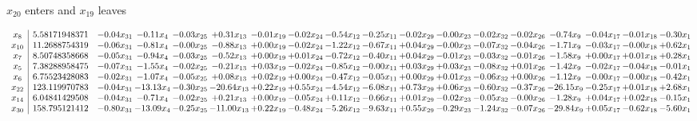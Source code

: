\documentclass[9pt]{article}
\begin{document}
 $ x_{20} $ enters and $ x_{19} $ leaves 

 \[\begin{array}{c| c c@{\hskip 2pt} c@{\hskip 2pt} c@{\hskip 2pt} c@{\hskip 2pt} c@{\hskip 2pt} c@{\hskip 2pt} c@{\hskip 2pt} c@{\hskip 2pt} c@{\hskip 2pt} c@{\hskip 2pt} c@{\hskip 2pt} c@{\hskip 2pt} c@{\hskip 2pt} c@{\hskip 2pt} c@{\hskip 2pt} c@{\hskip 2pt} }
 x_{8}   &  5.58171948371 & -0.04 x_{31} & -0.11 x_{4} & -0.03 x_{25} & +  0.31 x_{13} & -0.01 x_{19} & -0.02 x_{24} & -0.54 x_{12} & -0.25 x_{11} & -0.02 x_{29} & -0.00 x_{23} & -0.02 x_{32} & -0.02 x_{26} & -0.74 x_{9} & -0.04 x_{17} & -0.01 x_{18} & -0.30 x_{1}\\
 x_{10}   &  11.2688754319 & -0.06 x_{31} & -0.81 x_{4} & -0.00 x_{25} & -0.88 x_{13} & +  0.00 x_{19} & -0.02 x_{24} & -1.22 x_{12} & -0.67 x_{11} & +  0.04 x_{29} & -0.00 x_{23} & -0.07 x_{32} & -0.04 x_{26} & -1.71 x_{9} & -0.03 x_{17} & -0.00 x_{18} & +  0.62 x_{1}\\
 x_{7}   &  8.50748358668 & -0.05 x_{31} & -0.94 x_{4} & -0.03 x_{25} & -0.52 x_{13} & +  0.00 x_{19} & +  0.01 x_{24} & -0.72 x_{12} & -0.40 x_{11} & +  0.04 x_{29} & -0.01 x_{23} & -0.03 x_{32} & -0.01 x_{26} & -1.58 x_{9} & +  0.00 x_{17} & +  0.01 x_{18} & +  0.28 x_{1}\\
 x_{5}   &  7.38288958475 & -0.07 x_{31} & -1.55 x_{4} & -0.02 x_{25} & -0.21 x_{13} & +  0.03 x_{19} & -0.02 x_{24} & -0.85 x_{12} & -0.00 x_{11} & +  0.03 x_{29} & +  0.03 x_{23} & -0.08 x_{32} & +  0.01 x_{26} & -1.42 x_{9} & -0.02 x_{17} & -0.04 x_{18} & -0.01 x_{1}\\
 x_{6}   &  6.75523428083 & -0.02 x_{31} & -1.07 x_{4} & -0.05 x_{25} & +  0.08 x_{13} & +  0.02 x_{19} & +  0.00 x_{24} & -0.47 x_{12} & -0.05 x_{11} & +  0.00 x_{29} & +  0.01 x_{23} & -0.06 x_{32} & +  0.00 x_{26} & -1.12 x_{9} & -0.00 x_{17} & -0.00 x_{18} & -0.42 x_{1}\\
 x_{22}   &  123.119970783 & -0.04 x_{31} & -13.13 x_{4} & -0.30 x_{25} & -20.64 x_{13} & +  0.22 x_{19} & +  0.55 x_{24} & -4.54 x_{12} & -6.08 x_{11} & +  0.73 x_{29} & +  0.06 x_{23} & -0.60 x_{32} & -0.37 x_{26} & -26.15 x_{9} & -0.25 x_{17} & +  0.01 x_{18} & +  2.68 x_{1}\\
 x_{14}   &  6.04841429508 & -0.04 x_{31} & -0.71 x_{4} & -0.02 x_{25} & +  0.21 x_{13} & +  0.00 x_{19} & -0.05 x_{24} & +  0.11 x_{12} & -0.66 x_{11} & +  0.01 x_{29} & -0.02 x_{23} & -0.05 x_{32} & -0.00 x_{26} & -1.28 x_{9} & +  0.04 x_{17} & +  0.02 x_{18} & -0.15 x_{1}\\
 x_{30}   &  158.795121412 & -0.80 x_{31} & -13.09 x_{4} & -0.25 x_{25} & -11.00 x_{13} & +  0.22 x_{19} & -0.48 x_{24} & -5.26 x_{12} & -9.63 x_{11} & +  0.55 x_{29} & -0.29 x_{23} & -1.24 x_{32} & -0.07 x_{26} & -29.84 x_{9} & +  0.05 x_{17} & -0.62 x_{18} & -5.60 x_{1}\\

\end{array}\]
\end{document}
